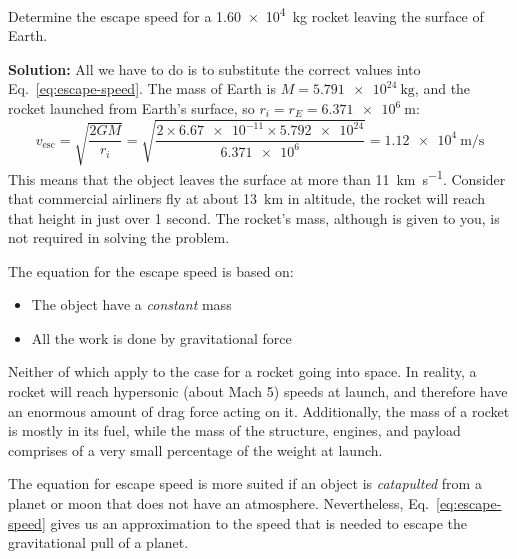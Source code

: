 \begin{example}
  Determine the escape speed for a \SI{1.60e4}{\kilo\gram} rocket leaving the
  surface of Earth.

  \textbf{Solution:} All we have to do is to substitute the correct values into
  Eq.~\ref{eq:escape-speed}. The mass of Earth is $M=\SI{5.791e24}{\kilo\gram}$,
  and the rocket launched from Earth's surface, so $r_i=r_E=\SI{6.371e6}\metre$:
  \begin{equation*}
    v_\text{esc}
    =\sqrt{\frac{2GM}{r_i}}
    =\sqrt{\frac{2\times \num{6.67e-11}\times\num{5.792e24}}{\num{6.371e6}}}
    =\SI{1.12e4}{\metre\per\second}
  \end{equation*}
  This means that the object leaves the surface at more than
  \SI{11}{\kilo\metre\per\second}. Consider that commercial airliners fly at
  about \SI{13}{\kilo\metre} in altitude, the rocket will reach that height in
  just over 1 second. The rocket's mass, although is given to you, is not
  required in solving the problem.
\end{example}

The equation for the escape speed is based on:
\begin{itemize}[itemsep=6pt]
\item The object have a \emph{constant} mass
\item All the work is done by gravitational force
\end{itemize}
Neither of which apply to the case for a rocket going into space. In reality, a
rocket will reach hypersonic (about Mach 5) speeds at launch, and therefore
have an enormous amount of drag force acting on it. Additionally, the mass of a
rocket is mostly in its fuel, while the mass of the structure, engines, and
payload comprises of a very small percentage of the weight at launch.

The equation for escape speed is more suited if an object is \emph{catapulted}
from a planet or moon that does not have an atmosphere. Nevertheless,
Eq.~\ref{eq:escape-speed} gives us an approximation to the speed that is needed
to escape the gravitational pull of a planet.

